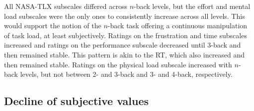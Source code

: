 \documentclass[
  man,floatsintext]{apa6}
\begin{document}
All NASA-TLX subscales differed across \(n\)-back levels, but the effort and mental load subscales were the only ones to consistently increase across all levels.
This would support the notion of the \(n\)-back task offering a continuous manipulation of task load, at least subjectively.
Ratings on the frustration and time subscales increased and ratings on the performance subscale decreased until 3-back and then remained stable.
This pattern is akin to the RT, which also increased and then remained stable.
Ratings on the physical load subscale increased with \(n\)-back levels, but not between 2- and 3-back and 3- and 4-back, respectively.

\hypertarget{decline-of-subjective-values-1}{%
\subsection{Decline of subjective values}\label{decline-of-subjective-values-1}}
\end{document}
